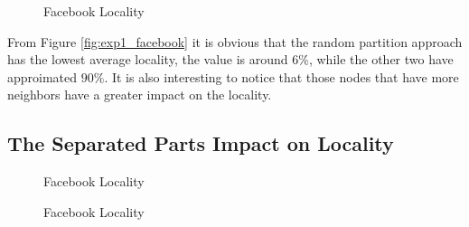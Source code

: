 \begin{figure}[t]
  \centering
  \hfill
  \hfill
  \hfill
  \caption{Facebook Locality}\label{fig:exp1_dblp}
\end{figure}

From Figure \ref{fig:exp1_facebook} it is obvious that the random partition approach has the lowest average locality, the value is around $6\%$, while the other two have approimated $90\%$. It is also interesting to notice that those nodes that have more neighbors have a greater impact on the locality.

\subsection{The Separated Parts Impact on Locality}

\begin{figure}[t]
  \hfill
  \hfill
  \hfill
  \caption{Facebook Locality}\label{fig:exp2}
\end{figure}

\begin{figure}[t]
  \hfill
  \hfill
  \hfill
  \caption{Facebook Locality}\label{fig:exp2}
\end{figure}

